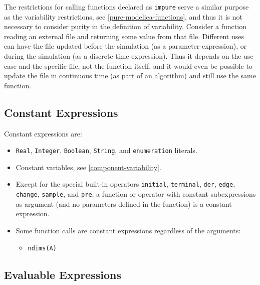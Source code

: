 \begin{nonnormative}
The restrictions for calling functions declared as \lstinline!impure! serve a similar purpose as the variability restrictions, see \cref{pure-modelica-functions}, and thus it is not necessary to consider purity in the definition of variability.
Consider a function reading an external file and returning some value from that file.
Different uses can have the file updated before the simulation (as a parameter-expression), or during the simulation (as a discrete-time expression).
Thus it depends on the use case and the specific file, not the function itself, and it would even be possible to update the file in continuous time (as part of an algorithm) and still use the same function.
\end{nonnormative}

\subsection{Constant Expressions}\label{constant-expressions}

Constant expressions are:
\begin{itemize}
\item
  \lstinline!Real!, \lstinline!Integer!, \lstinline!Boolean!, \lstinline!String!, and \lstinline!enumeration! literals.
\item
  Constant variables, see \cref{component-variability}.
\item
  Except for the special built-in operators \lstinline!initial!, \lstinline!terminal!, \lstinline!der!, \lstinline!edge!, \lstinline!change!, \lstinline!sample!, and \lstinline!pre!, a function or operator with constant subexpressions as argument (and no parameters defined in the function) is a constant expression.
\item
  Some function calls are constant expressions regardless of the arguments:
  \begin{itemize}
  \item
    \lstinline!ndims(A)!
  \end{itemize}
\end{itemize}

\subsection{Evaluable Expressions}\label{evaluable-expressions}

